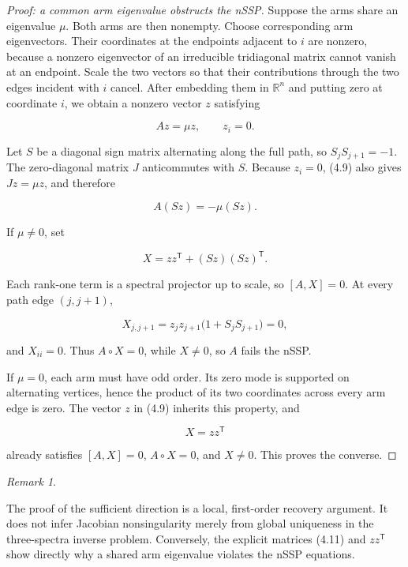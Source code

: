 \documentclass[11pt]{article}
\theoremstyle{remark}
\newtheorem{remark}[theorem]{Remark}
\begin{document}
\begin{proof}[Proof: a common arm eigenvalue obstructs the nSSP]

Suppose the arms share an eigenvalue $\mu$. Both arms are then nonempty. Choose corresponding arm
eigenvectors. Their coordinates at the endpoints adjacent to $i$ are nonzero, because a nonzero
eigenvector of an irreducible tridiagonal matrix cannot vanish at an endpoint. Scale the two vectors so
that their contributions through the two edges incident with $i$ cancel. After embedding them in
$\mathbb R^n$ and putting zero at coordinate $i$, we obtain a nonzero vector $z$ satisfying

\[
  Az=\mu z,\qquad z_i=0.                                 \tag{4.9}
\]

Let $S$ be a diagonal sign matrix alternating along the full path, so
$S_jS_{j+1}=-1$. The zero-diagonal matrix $J$ anticommutes with $S$. Because $z_i=0$, (4.9)
also gives $Jz=\mu z$, and therefore

\[
  A(Sz)=-\mu(Sz).                                        \tag{4.10}
\]

If $\mu\neq0$, set

\[
  X=zz^{\mathsf T}+(Sz)(Sz)^{\mathsf T}.                 \tag{4.11}
\]

Each rank-one term is a spectral projector up to scale, so $[A,X]=0$. At every path edge
$(j,j+1)$,

\[
  X_{j,j+1}=z_jz_{j+1}\bigl(1+S_jS_{j+1}\bigr)=0,
\]

and $X_{ii}=0$. Thus $A\circ X=0$, while $X\neq0$, so $A$ fails the nSSP.

If $\mu=0$, each arm must have odd order. Its zero mode is supported on alternating vertices, hence
the product of its two coordinates across every arm edge is zero. The vector $z$ in (4.9) inherits
this property, and

\[
  X=zz^{\mathsf T}
\]

already satisfies $[A,X]=0$, $A\circ X=0$, and $X\neq0$. This proves the converse. \qedhere

\end{proof}

\begin{remark}
\label{remark:4-2}

The proof of the sufficient direction is a local, first-order recovery argument. It does not infer
Jacobian nonsingularity merely from global uniqueness in the three-spectra inverse problem. Conversely,
the explicit matrices (4.11) and $zz^{\mathsf T}$ show directly why a shared arm eigenvalue violates
the nSSP equations.

\end{remark}
\end{document}
